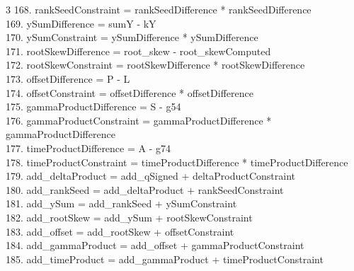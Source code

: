 \documentclass[10pt]{article}
\begin{document}
\begin{multicols}{3}
168. rankSeedConstraint = rankSeedDifference * rankSeedDifference\\
169. ySumDifference = sumY - kY\\
170. ySumConstraint = ySumDifference * ySumDifference\\
171. rootSkewDifference = root\_skew - root\_skewComputed\\
172. rootSkewConstraint = rootSkewDifference * rootSkewDifference\\
173. offsetDifference = P - L\\
174. offsetConstraint = offsetDifference * offsetDifference\\
175. gammaProductDifference = S - g54\\
176. gammaProductConstraint = gammaProductDifference * gammaProductDifference\\
177. timeProductDifference = A - g74\\
178. timeProductConstraint = timeProductDifference * timeProductDifference\\
179. add\_deltaProduct = add\_qSigned + deltaProductConstraint\\
180. add\_rankSeed = add\_deltaProduct + rankSeedConstraint\\
181. add\_ySum = add\_rankSeed + ySumConstraint\\
182. add\_rootSkew = add\_ySum + rootSkewConstraint\\
183. add\_offset = add\_rootSkew + offsetConstraint\\
184. add\_gammaProduct = add\_offset + gammaProductConstraint\\
185. add\_timeProduct = add\_gammaProduct + timeProductConstraint\\
\end{multicols}
\end{document}
